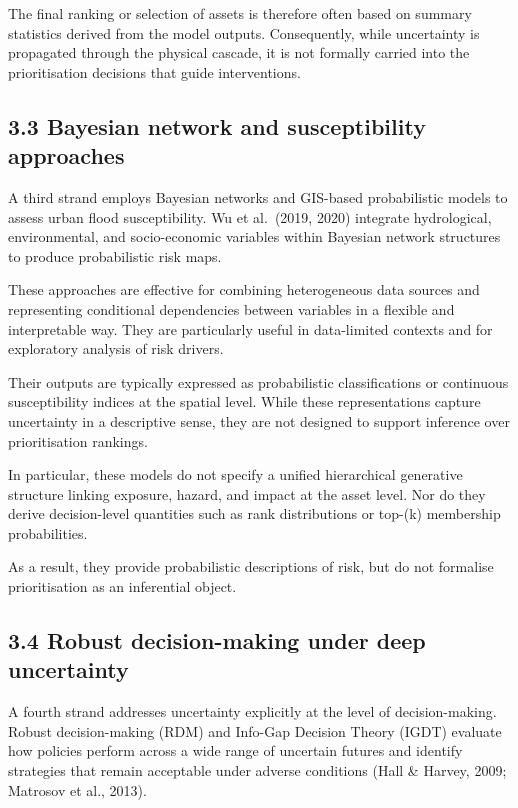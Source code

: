 \documentclass[
]{article}
\begin{document}
The final ranking or selection of assets is therefore often based on
summary statistics derived from the model outputs. Consequently, while
uncertainty is propagated through the physical cascade, it is not
formally carried into the prioritisation decisions that guide
interventions.

\subsection{3.3 Bayesian network and susceptibility
approaches}\label{bayesian-network-and-susceptibility-approaches}

A third strand employs Bayesian networks and GIS-based probabilistic
models to assess urban flood susceptibility. Wu et al.~(2019, 2020)
integrate hydrological, environmental, and socio-economic variables
within Bayesian network structures to produce probabilistic risk maps.

These approaches are effective for combining heterogeneous data sources
and representing conditional dependencies between variables in a
flexible and interpretable way. They are particularly useful in
data-limited contexts and for exploratory analysis of risk drivers.

Their outputs are typically expressed as probabilistic classifications
or continuous susceptibility indices at the spatial level. While these
representations capture uncertainty in a descriptive sense, they are not
designed to support inference over prioritisation rankings.

In particular, these models do not specify a unified hierarchical
generative structure linking exposure, hazard, and impact at the asset
level. Nor do they derive decision-level quantities such as rank
distributions or top-(k) membership probabilities.

As a result, they provide probabilistic descriptions of risk, but do not
formalise prioritisation as an inferential object.

\subsection{3.4 Robust decision-making under deep
uncertainty}\label{robust-decision-making-under-deep-uncertainty}

A fourth strand addresses uncertainty explicitly at the level of
decision-making. Robust decision-making (RDM) and Info-Gap Decision
Theory (IGDT) evaluate how policies perform across a wide range of
uncertain futures and identify strategies that remain acceptable under
adverse conditions (Hall \& Harvey, 2009; Matrosov et al., 2013).
\end{document}

